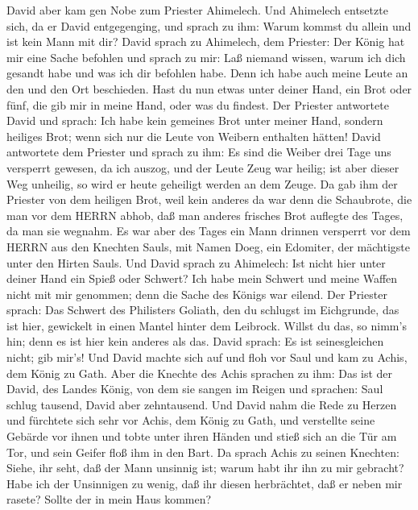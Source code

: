  David aber kam gen Nobe zum Priester Ahimelech. Und
Ahimelech entsetzte sich, da er David entgegenging, und sprach zu ihm:
Warum kommst du allein und ist kein Mann mit dir?  David
sprach zu Ahimelech, dem Priester: Der König hat mir eine Sache befohlen
und sprach zu mir: Laß niemand wissen, warum ich dich gesandt habe und
was ich dir befohlen habe. Denn ich habe auch meine Leute an den und den
Ort beschieden.  Hast du nun etwas unter deiner Hand, ein
Brot oder fünf, die gib mir in meine Hand, oder was du findest.
 Der Priester antwortete David und sprach: Ich habe kein
gemeines Brot unter meiner Hand, sondern heiliges Brot; wenn sich nur
die Leute von Weibern enthalten hätten!  David antwortete
dem Priester und sprach zu ihm: Es sind die Weiber drei Tage uns
versperrt gewesen, da ich auszog, und der Leute Zeug war heilig; ist
aber dieser Weg unheilig, so wird er heute geheiligt werden an dem
Zeuge.  Da gab ihm der Priester von dem heiligen Brot, weil
kein anderes da war denn die Schaubrote, die man vor dem HERRN abhob,
daß man anderes frisches Brot auflegte des Tages, da man sie wegnahm.
 Es war aber des Tages ein Mann drinnen versperrt vor dem
HERRN aus den Knechten Sauls, mit Namen Doeg, ein Edomiter, der
mächtigste unter den Hirten Sauls.  Und David sprach zu
Ahimelech: Ist nicht hier unter deiner Hand ein Spieß oder Schwert? Ich
habe mein Schwert und meine Waffen nicht mit mir genommen; denn die
Sache des Königs war eilend.  Der Priester sprach: Das
Schwert des Philisters Goliath, den du schlugst im Eichgrunde, das ist
hier, gewickelt in einen Mantel hinter dem Leibrock. Willst du das, so
nimm's hin; denn es ist hier kein anderes als das. David sprach: Es ist
seinesgleichen nicht; gib mir's!  Und David machte sich auf
und floh vor Saul und kam zu Achis, dem König zu Gath. 
Aber die Knechte des Achis sprachen zu ihm: Das ist der David, des
Landes König, von dem sie sangen im Reigen und sprachen: Saul schlug
tausend, David aber zehntausend.  Und David nahm die Rede
zu Herzen und fürchtete sich sehr vor Achis, dem König zu Gath,
 und verstellte seine Gebärde vor ihnen und tobte unter
ihren Händen und stieß sich an die Tür am Tor, und sein Geifer floß ihm
in den Bart.  Da sprach Achis zu seinen Knechten: Siehe,
ihr seht, daß der Mann unsinnig ist; warum habt ihr ihn zu mir gebracht?
 Habe ich der Unsinnigen zu wenig, daß ihr diesen
herbrächtet, daß er neben mir rasete? Sollte der in mein Haus kommen?

